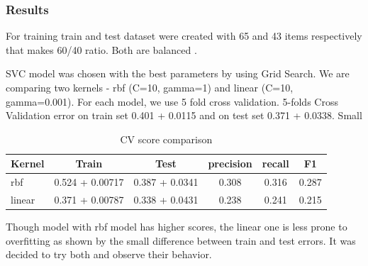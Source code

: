 \documentclass[11pt]{article}
\begin{document}
\subsubsection{Results}

For training train and test dataset were created with 65 and 43 items respectively that makes 60/40 ratio. Both are balanced . 

SVC model was chosen with the best parameters by using Grid Search. We are comparing two kernels - rbf (C=10, gamma=1) and linear (C=10, gamma=0.001). For each model, we use 5 fold cross validation.
5-folds Cross Validation error on train set 0.401 + 0.0115 and on test set 0.371 + 0.0338. Small %

\begin{table}[htb]
\begin{center}
\begin{tabular}{ |p{2cm}|c|c|c|c|c| }
\hline
Kernel 	& Train & Test & precision & recall & F1 \\ \hline
rbf		& 0.524 + 0.00717 & 0.387 + 0.0341 & 0.308 & 0.316 & 0.287 \\ \hline
linear	& 0.371 + 0.00787 & 0.338 + 0.0431 & 0.238 & 0.241 & 0.215 \\ \hline
\end{tabular}
\caption{CV score comparison}
\end{center}
\end{table}
\FloatBarrier

Though model with rbf model has higher scores, the linear one is less prone to overfitting as shown by the small difference between train and test errors. It was decided to try both and observe their behavior.
\end{document}
